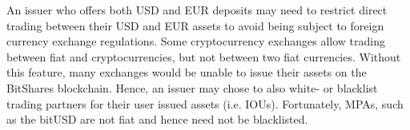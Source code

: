 An issuer who offers both USD and EUR deposits may need to restrict direct
trading between their USD and EUR assets to avoid being subject to foreign
currency exchange regulations. Some cryptocurrency exchanges allow trading
between fiat and cryptocurrencies, but not between two fiat currencies.
Without this feature, many exchanges would be unable to issue their assets on
the BitShares blockchain. Hence, an issuer may chose to also white- or
blacklist trading partners for their user issued assets (i.e. IOUs).
Fortunately, MPAs, such as the bitUSD are not fiat and hence need not be
blacklisted.
